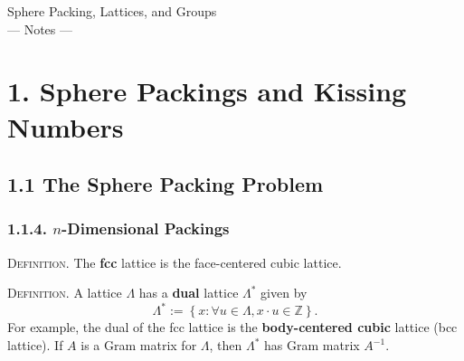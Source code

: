 \documentclass{article}
\newcommand{\Z}{\mathbb{Z}}
\renewcommand{\=}{\equiv}
\renewcommand{\i}{^{-1}}
\newcommand{\set}[1]{\left\{ #1 \right\}}
\newcommand{\header}[1]{\vspace{1em}\noindent\textsc{#1.} }
\begin{document}
\begin{center}
  {\huge\sc Sphere Packing, Lattices, and Groups}\\[2em]
  {\Large --- Notes ---}
\end{center}

\vspace{4em}

\section*{1. Sphere Packings and Kissing Numbers}

\subsection*{1.1 The Sphere Packing Problem}

\subsubsection*{1.1.4. $n$-Dimensional Packings}

\header{Definition}
The \textbf{fcc} lattice is the face-centered cubic lattice.

\header{Definition}
A lattice $\Lambda$ has a \textbf{dual} lattice $\Lambda^*$ given by
$$ \Lambda^* := \set{ x : \forall u \in \Lambda, x \cdot u \in \Z }. $$
For example, the dual of the fcc lattice is the \textbf{body-centered cubic} lattice (bcc lattice).
If $A$ is a Gram matrix for $\Lambda$, then $\Lambda^*$ has Gram matrix $A\i$.
\end{document}
